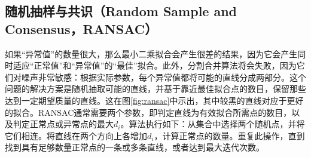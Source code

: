 
\subsection{随机抽样与共识（Random Sample and Consensus，RANSAC）}

如果“异常值”的数量很大，那么最小二乘拟合会产生很差的结果，因为它会产生同时适应“正常值”和“异常值”的“最佳”拟合。此外，分割合并算法将会失败，因为它们对噪声非常敏感：根据实际参数，每个异常值都将可能的直线分成两部分。这个问题的解决方案是随机抽取可能的直线，并基于靠近最佳拟合点的数目，保留那些达到一定期望质量的直线。这在图\ref{fig:ransac}中示出，其中较黑的直线对应于更好的拟合。RANSAC通常需要两个参数，即判定直线为有效拟合所需点的数目，以及判定正常点或异常点的最大$d_i$。算法执行如下：从集合中选择两个随机点，并将它们相连。将直线在两个方向上各增加$d_i$，计算正常点的数量。重复此操作，直到找到具有足够数量正常点的一条或多条直线，或者达到最大迭代次数。

